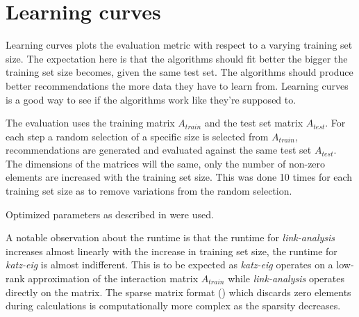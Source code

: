 
\section{Learning curves}\label{sec:graphs:learning_curves}

Learning curves plots the evaluation metric with respect to a varying training set size. The expectation here is that the algorithms should fit better the bigger the training set size becomes, given the same test set. The algorithms should produce better recommendations the more data they have to learn from. Learning curves is a good way to see if the algorithms work like they're supposed to.

The evaluation uses the training matrix $A_{train}$ and the test set matrix $A_{test}$. For each step a random selection of a specific size is selected from $A_{train}$, recommendations are generated and evaluated against the same test set $A_{test}$. The dimensions of the matrices will the same, only the number of non-zero elements are increased with the training set size. This was done 10 times for each training set size as to remove variations from the random selection.

Optimized parameters as described in  were used.

\FloatBarrier

A notable observation about the runtime is that the runtime for \textit{link-analysis} increases almost linearly with the increase in training set size, the runtime for \textit{katz-eig} is almost indifferent. This is to be expected as \textit{katz-eig} operates on a low-rank approximation of the interaction matrix $A_{train}$ while \textit{link-analysis} operates directly on the matrix. The sparse matrix format () which discards zero elements during calculations is computationally more complex as the sparsity decreases.

\FloatBarrier
